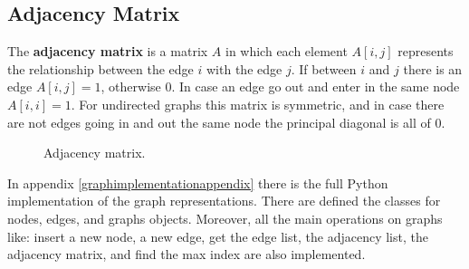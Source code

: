 \subsection{Adjacency Matrix}
The \textbf{adjacency matrix} is a matrix \(A\) in which each element \(A[i, j]\) represents the relationship between the edge \(i\) with the edge \(j\). If between \(i\) and \(j\) there is an edge \(A[i, j] = 1\), otherwise \(0\). In case an edge go out and enter in the same node \(A[i, i] = 1\). For undirected graphs this matrix is symmetric, and in case there are not edges going in and out the same node the principal diagonal is all of \(0\).

\begin{figure}[H]
\centering
{}  
\caption[Adjacency matrix.]{Adjacency matrix.}
\label{graphs_5}
\end{figure}

In appendix \ref{graphimplementationappendix} there is the full Python implementation of the graph representations. There are defined the classes for nodes, edges, and graphs objects. Moreover, all the main operations on graphs like: insert a new node, a new edge, get the edge list, the adjacency list, the adjacency matrix, and find the max index are also implemented.

